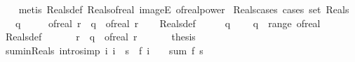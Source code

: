 \begin{isabellebody}
%
\isadelimproof
\ \ %
\endisadelimproof
%
\isatagproof
{}\isamarkupfalse%
\ {\isacharparenleft}{\kern0pt}metis\ Reals{\isacharunderscore}{\kern0pt}def\ Reals{\isacharunderscore}{\kern0pt}of{\isacharunderscore}{\kern0pt}real\ imageE\ of{\isacharunderscore}{\kern0pt}real{\isacharunderscore}{\kern0pt}power{\isacharparenright}{\kern0pt}%
\endisatagproof
{\isafoldproof}%
%
\isadelimproof
\isanewline
%
\endisadelimproof
\isanewline
{}\isamarkupfalse%
\ Reals{\isacharunderscore}{\kern0pt}cases\ {\isacharbrackleft}{\kern0pt}cases\ set{\isacharcolon}{\kern0pt}\ Reals{\isacharbrackright}{\kern0pt}{\isacharcolon}{\kern0pt}\isanewline
\ \ \ {\isachardoublequoteopen}q\ {\isasymin}\ {\isasymreal}{\isachardoublequoteclose}\isanewline
\ \ \ {\isacharparenleft}{\kern0pt}of{\isacharunderscore}{\kern0pt}real{\isacharparenright}{\kern0pt}\ r\ \ {\isachardoublequoteopen}q\ {\isacharequal}{\kern0pt}\ of{\isacharunderscore}{\kern0pt}real\ r{\isachardoublequoteclose}\isanewline
%
\isadelimproof
\ \ %
\endisadelimproof
%
\isatagproof
{}\isamarkupfalse%
\ Reals{\isacharunderscore}{\kern0pt}def\isanewline
{}\isamarkupfalse%
\ {\isacharminus}{\kern0pt}\isanewline
\ \ \isamarkupfalse%
\ {\isacartoucheopen}q\ {\isasymin}\ {\isasymreal}{\isacartoucheclose}\ \isamarkupfalse%
\ {\isachardoublequoteopen}q\ {\isasymin}\ range\ of{\isacharunderscore}{\kern0pt}real{\isachardoublequoteclose}\ \isamarkupfalse%
\ Reals{\isacharunderscore}{\kern0pt}def\ \isacommand{{\isachardot}{\kern0pt}}\isamarkupfalse%
\isanewline
\ \ \isamarkupfalse%
\ \isamarkupfalse%
\ r\ \ {\isachardoublequoteopen}q\ {\isacharequal}{\kern0pt}\ of{\isacharunderscore}{\kern0pt}real\ r{\isachardoublequoteclose}\ \isacommand{{\isachardot}{\kern0pt}{\isachardot}{\kern0pt}}\isamarkupfalse%
\isanewline
\ \ \isamarkupfalse%
\ \isamarkupfalse%
\ thesis\ \isacommand{{\isachardot}{\kern0pt}{\isachardot}{\kern0pt}}\isamarkupfalse%
\isanewline
{}\isamarkupfalse%
%
\endisatagproof
{\isafoldproof}%
%
\isadelimproof
\isanewline
%
\endisadelimproof
\isanewline
{}\isamarkupfalse%
\ sum{\isacharunderscore}{\kern0pt}in{\isacharunderscore}{\kern0pt}Reals\ {\isacharbrackleft}{\kern0pt}intro{\isacharcomma}{\kern0pt}simp{\isacharbrackright}{\kern0pt}{\isacharcolon}{\kern0pt}\ {\isachardoublequoteopen}{\isacharparenleft}{\kern0pt}{\isasymAnd}i{\isachardot}{\kern0pt}\ i\ {\isasymin}\ s\ {\isasymLongrightarrow}\ f\ i\ {\isasymin}\ {\isasymreal}{\isacharparenright}{\kern0pt}\ {\isasymLongrightarrow}\ sum\ f\ s\ {\isasymin}\ {\isasymreal}{\isachardoublequoteclose}\isanewline

\end{isabellebody}
